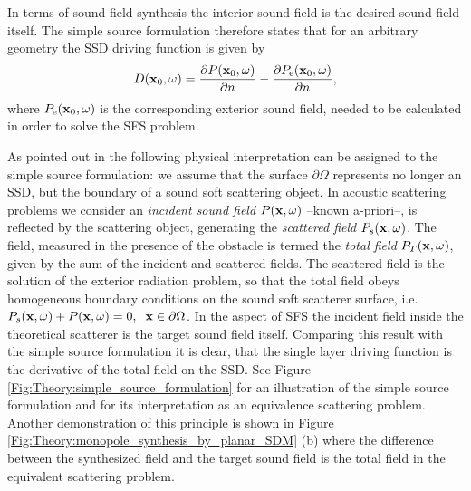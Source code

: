 In terms of sound field synthesis the interior sound field is the desired sound field itself. The simple source formulation therefore states that for an arbitrary geometry the SSD driving function is given by
\begin{equation}
D(\mathbf{x}_0,\omega) = 
\frac{\partial P(\mathbf{x}_0,\omega)}{\partial n} - \frac{\partial P_{\mathrm{e}}(\mathbf{x}_0,\omega)}{\partial n},
\label{Eq:Theory:Source_strength}
\end{equation}
where $P_{\mathrm{e}}(\mathbf{x}_0,\omega)$ is the corresponding exterior sound field, needed to be calculated in order to solve the SFS problem.

\vspace{3mm}
As pointed out in \cite{Fazi2013:Equivalent_scattering, Fazi2010, Schultz2014:Comparing_approaches, Zotter2013:uniqueness} the following physical interpretation can be assigned to the simple source formulation: we assume that the surface $\partial \Omega$ represents no longer an SSD, but the boundary of a sound soft scattering object. In acoustic scattering problems we consider an \emph{incident sound field} $P(\mathbf{x},\omega)$ --known a-priori--, is reflected by the scattering object, generating the \emph{scattered field} $P_s(\mathbf{x},\omega)$.
The field, measured in the presence of the obstacle is termed the \emph{total field} $P_T(\mathbf{x},\omega)$, given by the sum of the incident and scattered fields.
The scattered field is the solution of the exterior radiation problem, so that the total field obeys homogeneous boundary conditions on the sound soft scatterer surface, i.e. $P_s(\mathbf{x},\omega) + P(\mathbf{x},\omega) = 0, \hspace{.2cm} \mathbf{x} \in \partial \Omega$.
In the aspect of SFS the incident field inside the theoretical scatterer is the target sound field itself.
Comparing this result with the simple source formulation it is clear, that the single layer driving function is the derivative of the total field on the SSD.
See Figure \ref{Fig:Theory:simple_source_formulation} for an illustration of the simple source formulation and for its interpretation as an equivalence scattering problem.
Another demonstration of this principle is shown in Figure \ref{Fig:Theory:monopole_synthesis_by_planar_SDM} (b) where the difference between the synthesized field and the target sound field is the total field in the equivalent scattering problem.

